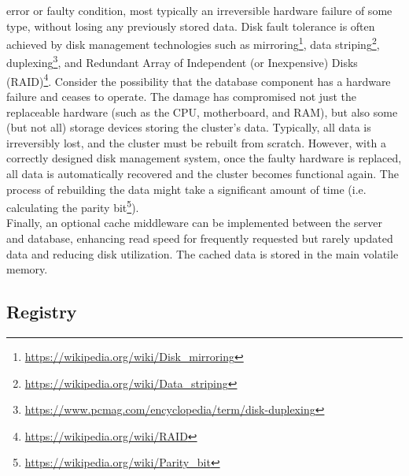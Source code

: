 error or faulty condition, most typically an irreversible hardware failure of
some type, without losing any previously stored data. Disk fault tolerance is
often achieved by disk management technologies such as mirroring\footnote{\url{https://wikipedia.org/wiki/Disk_mirroring}},
data striping\footnote{\url{https://wikipedia.org/wiki/Data_striping}},
duplexing\footnote{\url{https://www.pcmag.com/encyclopedia/term/disk-duplexing}},
and Redundant Array of Independent (or Inexpensive) Disks (RAID)\footnote{\url{https://wikipedia.org/wiki/RAID}}\cite{disk_management_technologies}.
Consider the possibility that the database component has a hardware failure and ceases
to operate. The damage has compromised not just the replaceable hardware (such as
the CPU, motherboard, and RAM), but also some (but not all) storage devices storing
the cluster's data. Typically, all data is irreversibly lost, and the cluster
must be rebuilt from scratch. However, with a correctly designed disk management
system, once the faulty hardware is replaced, all data is automatically
recovered and the cluster becomes functional again. The process of rebuilding the
data might take a significant amount of time (i.e. calculating the parity bit\footnote{\url{https://wikipedia.org/wiki/Parity_bit}}).
\\ %
Finally, an optional cache middleware can be implemented between the server and database,
enhancing read speed for frequently requested but rarely updated data and
reducing disk utilization. The cached data is stored in the main volatile memory.

\subsection{Registry}
\label{subsec:architecture_components_registry}

